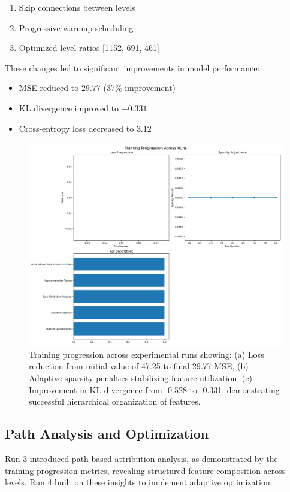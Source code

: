\documentclass{article} %
\begin{document}
\begin{enumerate}
    \item Skip connections between levels
    \item Progressive warmup scheduling
    \item Optimized level ratios [1152, 691, 461]
\end{enumerate}

These changes led to significant improvements in model performance:
\begin{itemize}
    \item MSE reduced to $29.77$ (37\% improvement)
    \item KL divergence improved to $-0.331$
    \item Cross-entropy loss decreased to $3.12$
\end{itemize}

\begin{figure}[h]
    \centering
    \includegraphics[width=\textwidth]{training_progression.png}
    \caption{Training progression across experimental runs showing: (a) Loss reduction from initial value of 47.25 to final 29.77 MSE, (b) Adaptive sparsity penalties stabilizing feature utilization, (c) Improvement in KL divergence from -0.528 to -0.331, demonstrating successful hierarchical organization of features.}
    \label{fig:training_progress}
\end{figure}

\subsection{Path Analysis and Optimization}
Run 3 introduced path-based attribution analysis, as demonstrated by the training progression metrics, revealing structured feature composition across levels. Run 4 built on these insights to implement adaptive optimization:
\end{document}
